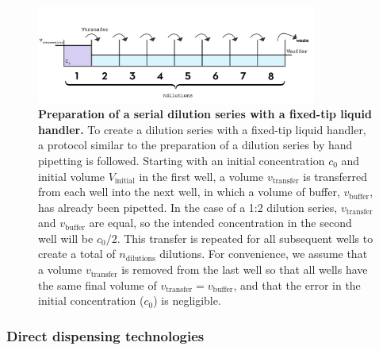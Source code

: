 \documentclass[aps,pre,twocolumn,nofootinbib,superscriptaddress,linenumbers]{revtex4-1}
\begin{document}
\begin{figure}[tb]
    \includegraphics[width=0.82\textwidth]{../figures/dilution.pdf}

  \caption{{\bf Preparation of a serial dilution series with a fixed-tip liquid handler.}
  To create a dilution series with a fixed-tip liquid handler, a protocol similar to the preparation of a dilution series by hand pipetting is followed.
  Starting with an initial concentration $c_0$ and initial volume $V_\mathrm{initial}$ in the first well, a volume $v_\mathrm{transfer}$ is transferred from each well into the next well, in which a volume of buffer, $v_\mathrm{buffer}$, has already been pipetted. 
  In the case of a 1:2 dilution series, $v_\mathrm{transfer}$ and $v_\mathrm{buffer}$ are equal, so the intended concentration in the second well will be $c_0/2$. 
  This transfer is repeated for all subsequent wells to create a total of $n_\mathrm{dilutions}$ dilutions. 
  For convenience, we assume that a volume $v_\mathrm{transfer}$ is removed from the last well so that all wells have the same final volume of $v_\mathrm{transfer} = v_\mathrm{buffer}$, and that the error in the initial concentration ($c_0$) is negligible.
  }
  \label{fig:dilution}
\end{figure}

\subsubsection*{Direct dispensing technologies}
\end{document}
